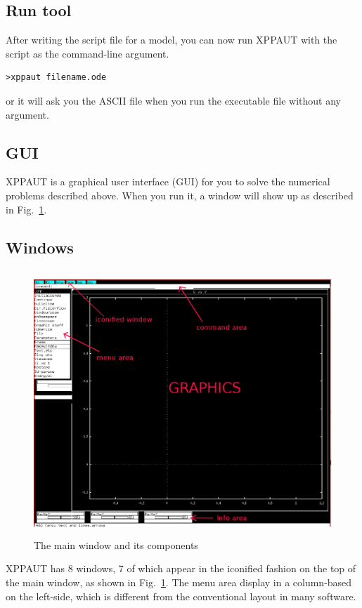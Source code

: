 \subsection{Run tool}
\label{sec:run-tool}

After writing the script file for a model, you can now run XPPAUT with
the script as the command-line argument.
\begin{verbatim}
>xppaut filename.ode
\end{verbatim}
or it will ask you the ASCII file when you run the executable file
without any argument.


\subsection{GUI}
\label{sec:gui}

XPPAUT is a graphical user interface (GUI) for you to solve the
numerical problems described above. When you run it, a window will
show up as described in Fig.~\ref{fig:XPP_GUI}.

\subsection{Windows}
\label{sec:windows}


\begin{figure}[htb]
  \centerline{\includegraphics[height=10cm]{./images/XPP_GUI.eps}}
  \caption{The main window and its components}\label{fig:XPP_GUI}
\end{figure}

XPPAUT has 8 windows, 7 of which appear in the iconified fashion on
the top of the main window, as shown in Fig.~\ref{fig:XPP_GUI}. The
menu area display in a column-based on the left-side, which is
different from the conventional layout in many software.

